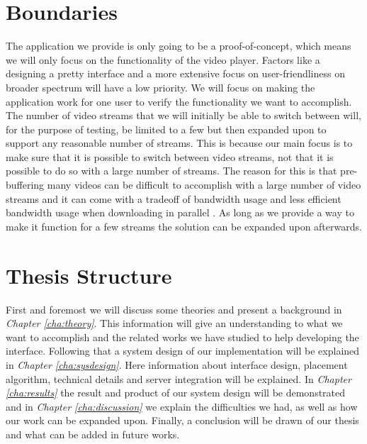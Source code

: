 \section{Boundaries}
\label{sec:boundaries}

The application we provide is only going to be a proof-of-concept, which means we will only focus on the functionality of the video player. Factors like a designing a pretty interface and a more extensive focus on user-friendliness on broader spectrum will have a low priority. We will focus on making the application work for one user to verify the functionality we want to accomplish. The number of video streams that we will initially be able to switch between will, for the purpose of testing, be limited to a few but then expanded upon to support any reasonable number of streams. This is because our main focus is to make sure that it is possible to switch between video streams, not that it is possible to do so with a large number of streams. The reason for this is that pre-buffering many videos can be difficult to accomplish with a large number of video streams and it can come with a tradeoff of bandwidth usage and less efficient bandwidth usage when downloading in parallel \cite{watchingprefetching, scalableOnDemand}. As long as we provide a way to make it function for a few streams the solution can be expanded upon afterwards.

\section{Thesis Structure}
First and foremost we will discuss some theories and present a background in \textit{Chapter \ref{cha:theory}}. This information will give an understanding to what we want to accomplish and the related works we have studied to help developing the interface. Following that a system design of our implementation will be explained in \textit{Chapter \ref{cha:sysdesign}}. Here information about interface design, placement algorithm, technical details and server integration will be explained. In \textit{Chapter \ref{cha:results}} the result and product of our system design will be demonstrated and in \textit{Chapter \ref{cha:discussion}} we explain the difficulties we had, as well as how our work can be expanded upon. Finally, a conclusion will be drawn of our thesis and what can be added in future works.
